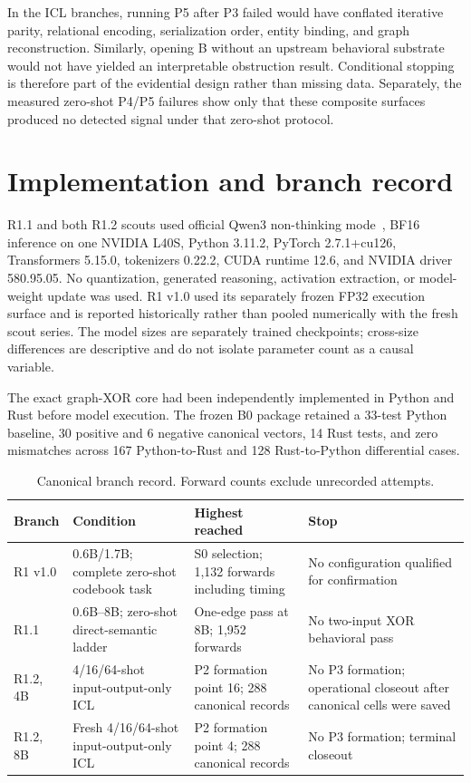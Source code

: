 \documentclass[10pt,a4paper]{article}
\begin{document}
In the ICL branches, running P5 after P3 failed would have conflated iterative parity, relational encoding, serialization order, entity binding, and graph reconstruction. Similarly, opening B without an upstream behavioral substrate would not have yielded an interpretable obstruction result. Conditional stopping is therefore part of the evidential design rather than missing data. Separately, the measured zero-shot P4/P5 failures show only that these composite surfaces produced no detected signal under that zero-shot protocol.

\section{Implementation and branch record}

R1.1 and both R1.2 scouts used official Qwen3 non-thinking mode~\cite{yang2025}, BF16 inference on one NVIDIA L40S, Python 3.11.2, PyTorch 2.7.1+cu126, Transformers 5.15.0, tokenizers 0.22.2, CUDA runtime 12.6, and NVIDIA driver 580.95.05. No quantization, generated reasoning, activation extraction, or model-weight update was used. R1 v1.0 used its separately frozen FP32 execution surface and is reported historically rather than pooled numerically with the fresh scout series. The model sizes are separately trained checkpoints; cross-size differences are descriptive and do not isolate parameter count as a causal variable.

The exact graph-XOR core had been independently implemented in Python and Rust before model execution. The frozen B0 package retained a 33-test Python baseline, 30 positive and 6 negative canonical vectors, 14 Rust tests, and zero mismatches across 167 Python-to-Rust and 128 Rust-to-Python differential cases.

\begin{table}[H]
\centering
\caption{Canonical branch record. Forward counts exclude unrecorded attempts.}
\label{tab:branches}
\begin{tabularx}{\textwidth}{@{}p{18mm}p{37mm}p{42mm}Y@{}}
\toprule
Branch & Condition & Highest reached & Stop \\
\midrule
R1 v1.0 & 0.6B/1.7B; complete zero-shot codebook task & S0 selection; 1,132 forwards including timing & No configuration qualified for confirmation \\
R1.1 & 0.6B--8B; zero-shot direct-semantic ladder & One-edge pass at 8B; 1,952 forwards & No two-input XOR behavioral pass \\
R1.2, 4B & 4/16/64-shot input-output-only ICL & P2 formation point 16; 288 canonical records & No P3 formation; operational closeout after canonical cells were saved \\
R1.2, 8B & Fresh 4/16/64-shot input-output-only ICL & P2 formation point 4; 288 canonical records & No P3 formation; terminal closeout \\
\bottomrule
\end{tabularx}
\end{table}
\end{document}
